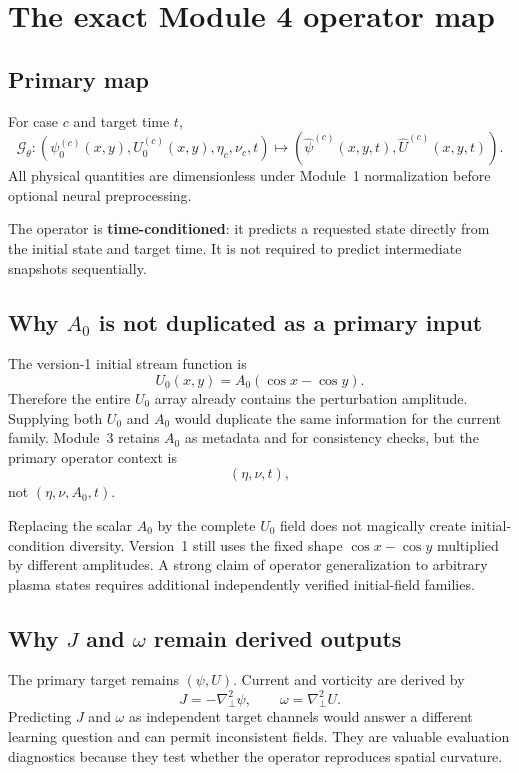 \documentclass[11pt]{article}
\newcommand{\Lap}{\nabla_\perp^2}
\begin{document}
\section{The exact Module 4 operator map}
\label{sec:operator_map}

\subsection{Primary map}
For case $c$ and target time $t$,
\begin{equation}
\boxed{
\mathcal{G}_\theta:
\left(\psi_0^{(c)}(x,y),U_0^{(c)}(x,y),\eta_c,\nu_c,t\right)
\longmapsto
\left(\widehat\psi^{(c)}(x,y,t),\widehat U^{(c)}(x,y,t)\right).
}
\label{eq:operator_map}
\end{equation}
All physical quantities are dimensionless under Module~1 normalization before optional neural preprocessing.

The operator is \textbf{time-conditioned}: it predicts a requested state directly from the initial state and target time. It is not required to predict intermediate snapshots sequentially.

\subsection{Why $A_0$ is not duplicated as a primary input}
The version-1 initial stream function is
\[
U_0(x,y)=A_0(\cos x-\cos y).
\]
Therefore the entire $U_0$ array already contains the perturbation amplitude. Supplying both $U_0$ and $A_0$ would duplicate the same information for the current family. Module~3 retains $A_0$ as metadata and for consistency checks, but the primary operator context is
\[
(\eta,\nu,t),
\]
not $(\eta,\nu,A_0,t)$.

\begin{warningbox}
Replacing the scalar $A_0$ by the complete $U_0$ field does not magically create initial-condition diversity. Version~1 still uses the fixed shape $\cos x-\cos y$ multiplied by different amplitudes. A strong claim of operator generalization to arbitrary plasma states requires additional independently verified initial-field families.
\end{warningbox}

\subsection{Why $J$ and $\omega$ remain derived outputs}
The primary target remains $(\psi,U)$. Current and vorticity are derived by
\[
J=-\Lap\psi,\qquad \omega=\Lap U.
\]
Predicting $J$ and $\omega$ as independent target channels would answer a different learning question and can permit inconsistent fields. They are valuable evaluation diagnostics because they test whether the operator reproduces spatial curvature.
\end{document}

